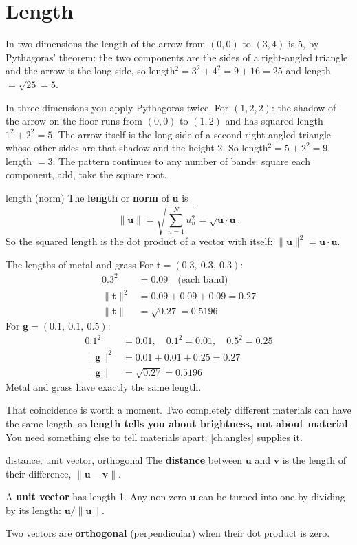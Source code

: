 \documentclass[11pt,a4paper,oneside,openany]{book}
\newcommand{\B}[1]{{\symbf{#1}}}
\newcommand{\B}[1]{{\bm{#1}}}
\newcommand{\nrm}[1]{\lVert #1\rVert}
\newcommand{\vt}{\B{t}}
\newcommand{\vu}{\B{u}}
\newcommand{\vv}{\B{v}}
\newcommand{\vg}{\B{g}}
\begin{document}
\section{Length}

In two dimensions the length of the arrow from $(0,0)$ to $(3,4)$ is 5, by Pythagoras' theorem: the two components are the
sides of a right-angled triangle and the arrow is the long side, so length$^2=3^2+4^2=9+16=25$ and length $=\sqrt{25}=5$.

In three dimensions you apply Pythagoras twice. For $(1,2,2)$: the shadow of the arrow on the floor runs from $(0,0)$ to
$(1,2)$ and has squared length $1^2+2^2=5$. The arrow itself is the long side of a second right-angled triangle whose
other sides are that shadow and the height 2. So length$^2 = 5+2^2=9$, length $=3$. The pattern continues to any number
of bands: square each component, add, take the square root.

\begin{defn}{length (norm)}
The \textbf{length} or \textbf{norm} of $\vu$ is
\[
  \nrm{\vu}=\sqrt{\sum_{n=1}^N u_n^2}=\sqrt{\vu\cdot\vu}.
\]
So the squared length is the dot product of a vector with itself: $\nrm{\vu}^2=\vu\cdot\vu$.
\end{defn}

\begin{worked}[label=we:len]{The lengths of metal and grass}
For $\vt=(0.3,\ 0.3,\ 0.3)$:
\begin{align*}
0.3^2 &= 0.09 \quad\text{(each band)}\\
\nrm{\vt}^2 &= 0.09+0.09+0.09=0.27\\
\nrm{\vt} &= \sqrt{0.27}=0.5196
\end{align*}
For $\vg=(0.1,\ 0.1,\ 0.5)$:
\begin{align*}
0.1^2 &= 0.01,\quad 0.1^2=0.01,\quad 0.5^2=0.25\\
\nrm{\vg}^2 &= 0.01+0.01+0.25=0.27\\
\nrm{\vg} &= \sqrt{0.27}=0.5196
\end{align*}
Metal and grass have exactly the same length.
\end{worked}

That coincidence is worth a moment. Two completely different materials can have the same length, so \textbf{length tells
you about brightness, not about material}. You need something else to tell materials apart; \cref{ch:angles} supplies it.

\begin{defn}{distance, unit vector, orthogonal}
The \textbf{distance} between $\vu$ and $\vv$ is the length of their difference, $\nrm{\vu-\vv}$.

A \textbf{unit vector} has length 1. Any non-zero $\vu$ can be turned into one by dividing by its length: $\vu/\nrm{\vu}$.

Two vectors are \textbf{orthogonal} (perpendicular) when their dot product is zero.
\end{defn}
\end{document}
